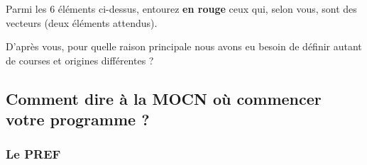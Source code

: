 \documentclass[12pt]{article}
\newcounter{exo}
\newenvironment{exo}{\stepcounter{exo}\vspace{0.5cm}{\bfseries Question \theexo\ :}}{\par\vspace{0.5cm}}
\begin{document}


\begin{exo}\label{exo66} Parmi les 6 éléments ci-dessus, entourez \textbf{en rouge} ceux qui, selon vous, sont des vecteurs (deux éléments attendus).  \end{exo}

\newpage

\begin{exo}\label{exo1} D'après vous, pour quelle raison principale nous avons eu besoin de définir autant de courses et origines différentes ? \end{exo}




\subsection{Comment dire à la MOCN où commencer votre programme ?}
\subsubsection{Le PREF}
\end{document}
